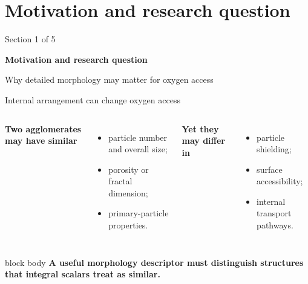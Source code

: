\documentclass[aspectratio=169,11pt]{beamer}
\newcommand{\hi}[1]{\textcolor{tumblue}{\textbf{#1}}}
\newcommand{\takeaway}[1]{%
	\begin{beamercolorbox}[rounded=true,sep=.55em]{block body}
		\centering\color{tumdark}\textbf{#1}
\end{beamercolorbox}}
\begin{document}
\section[Motivation]{Motivation and research question}
\begin{frame}{}
  \vfill
  {\large\color{tumgray}Section 1 of 5}\par\vspace{0.4cm}
  {\LARGE\color{tumblue}\textbf{Motivation and research question}}\par\vspace{0.5cm}
  {\large Why detailed morphology may matter for oxygen access}
  \vfill
\end{frame}

\begin{frame}{Internal arrangement can change oxygen access}
  \begin{columns}[c,onlytextwidth]
      \hi{Two agglomerates may have similar}
      \begin{itemize}
        \item particle number and overall size;
        \item porosity or fractal dimension;
        \item primary-particle properties.
      \end{itemize}
      \vspace{.25cm}
      \hi{Yet they may differ in}
      \begin{itemize}
        \item particle shielding;
        \item surface accessibility;
        \item internal transport pathways.
      \end{itemize}
    \centering
  \end{columns}
  \vspace{.2cm}
  \takeaway{A useful morphology descriptor must distinguish structures that integral scalars treat as similar.}
\end{frame}
\end{document}
